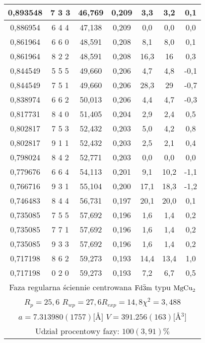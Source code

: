 \documentclass[a4paper,12pt]{article}
\numberwithin{equation}{section}
\newcommand{\nit}[1]{\textnormal{#1}}
\begin{document}
\begin{appendices}
\begin{longtable}[c]{|c|c|c|c|c|c|c|}
0,893548	&	7   3   3	&	46,769	&	0,209	&	3,3	&	3,2	&	0,1	\\\hline
0,886954	&	6   4   4	&	47,138	&	0,209	&	0,0	&	0,0	&	0,0	\\\hline
0,861964	&	6   6   0	&	48,591	&	0,208	&	8,1	&	8,0	&	0,1	\\\hline
0,861964	&	8   2   2	&	48,591	&	0,208	&	16,3	&	16	&	0,3	\\\hline
0,844549	&	5   5   5	&	49,660	&	0,206	&	4,7	&	4,8	&	-0,1	\\\hline
0,844549	&	7   5   1	&	49,660	&	0,206	&	28,3	&	29	&	-0,7	\\\hline
0,838974	&	6   6   2	&	50,013	&	0,206	&	4,4	&	4,7	&	-0,3	\\\hline
0,817731	&	8   4   0	&	51,405	&	0,204	&	2,9	&	2,4	&	0,5	\\\hline
0,802817	&	7   5   3	&	52,432	&	0,203	&	5,0	&	4,2	&	0,8	\\\hline
0,802817	&	9   1   1	&	52,432	&	0,203	&	2,5	&	2,1	&	0,4	\\\hline
0,798024	&	8   4   2	&	52,771	&	0,203	&	0,0	&	0,0	&	0,0	\\\hline
0,779676	&	6   6   4	&	54,113	&	0,201	&	9,1	&	10,2	&	-1,1	\\\hline
0,766716	&	9   3   1	&	55,104	&	0,200	&	17,1	&	18,3	&	-1,2	\\\hline
0,746483	&	8   4   4	&	56,731	&	0,197	&	20,1	&	20,0	&	0,1	\\\hline
0,735085	&	7   5   5	&	57,692	&	0,196	&	1,6	&	1,4	&	0,2	\\\hline
0,735085	&	7   7   1	&	57,692	&	0,196	&	1,6	&	1,4	&	0,2	\\\hline
0,735085	&	9   3   3	&	57,692	&	0,196	&	1,6	&	1,4	&	0,2	\\\hline
0,717198	&	8   6   2	&	59,273	&	0,193	&	14,4	&	13,4	&	1,0	\\\hline
0,717198	&	0   2   0	&	59,273	&	0,193	&	7,2	&	6,7	&	0,5	\\\hline

    \multicolumn{7}{|c|}{ Faza regularna ściennie centrowana $\nit{Fd}\bar{3}\nit{m}$ typu $\nit{MgCu}_2$ }\\
    \multicolumn{7}{|c|}{ $R_p=25,6$ \hspace{0.4cm}$R_{wp}=27,6$\hspace{0.4cm}$R_{exp}=14,8$\hspace{0.4cm}$\chi^2=3,488$  }\\
    \multicolumn{7}{|c|}{ $a=7.313980(1757) [$\AA$]$ \hspace{0.4cm}$V=391.256(163)[$\AA$^3]$ }\\
    \multicolumn{7}{|c|}{ Udział procentowy fazy: $100(3,91)\%$ }\\\hline


\end{longtable}
\end{appendices}
\end{document}
